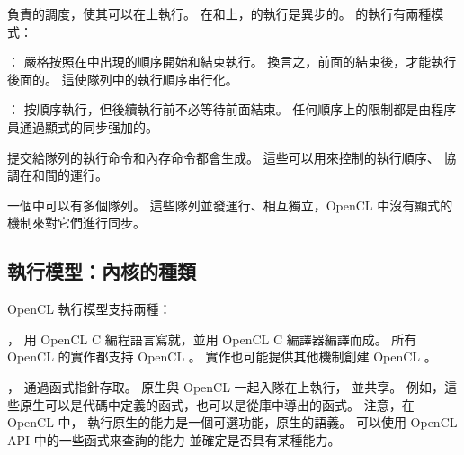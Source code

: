 負責的調度，使其可以在上執行。
在和上，的執行是異步的。
的執行有兩種模式：
\startigBase
\item {}：
嚴格按照在中出現的順序開始和結束執行。
換言之，前面的結束後，才能執行後面的。
這使隊列中的執行順序串行化。

\item {}：
按順序執行，但後續執行前不必等待前面結束。
任何順序上的限制都是由程序員通過顯式的同步强加的。
\stopigBase

提交給隊列的執行命令和內存命令都會生成。
這些可以用來控制的執行順序、
協調在和間的運行。

一個中可以有多個隊列。
這些隊列並發運行、相互獨立，OpenCL 中沒有顯式的機制來對它們進行同步。

\subsection{執行模型：內核的種類}

OpenCL 執行模型支持兩種：
\startigBase
\item {}，
用 OpenCL C 編程語言寫就，並用 OpenCL C 編譯器編譯而成。
所有 OpenCL 的實作都支持 OpenCL 。
實作也可能提供其他機制創建 OpenCL 。

\item {}，
通過函式指針存取。
原生與 OpenCL 一起入隊在上執行，
並共享。
例如，這些原生可以是代碼中定義的函式，也可以是從庫中導出的函式。
注意，在 OpenCL 中，
執行原生的能力是一個可選功能，原生的語義。
可以使用 OpenCL API 中的一些函式來查詢的能力
並確定是否具有某種能力。
\stopigBase

